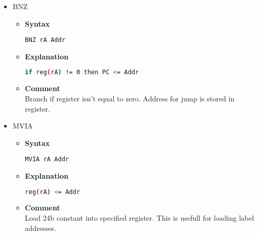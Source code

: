 \begin{itemize}
    \item BNZ
    \begin{itemize}
        \item \textbf{Syntax}
        \begin{lstlisting}[language={[x86masm]Assembler}, frame=single]
    BNZ rA Addr
        \end{lstlisting}
        \item \textbf{Explanation}
        \begin{lstlisting}[language=bash, frame=single]
    if reg(rA) != 0 then PC <= Addr
        \end{lstlisting}
        \item \textbf{Comment} \\
    Branch if register isn't equal to zero. Address for jump is stored in register.
    \end{itemize}

    \item MVIA
    \begin{itemize}
        \item \textbf{Syntax}
        \begin{lstlisting}[language={[x86masm]Assembler}, frame=single]
    MVIA rA Addr
        \end{lstlisting}
        \item \textbf{Explanation}
        \begin{lstlisting}[language=bash, frame=single]
    reg(rA) <= Addr
        \end{lstlisting}
        \item \textbf{Comment} \\
    Load 24b constant into specified register. This is usefull for loading label addresses.
    \end{itemize}

\end{itemize}
